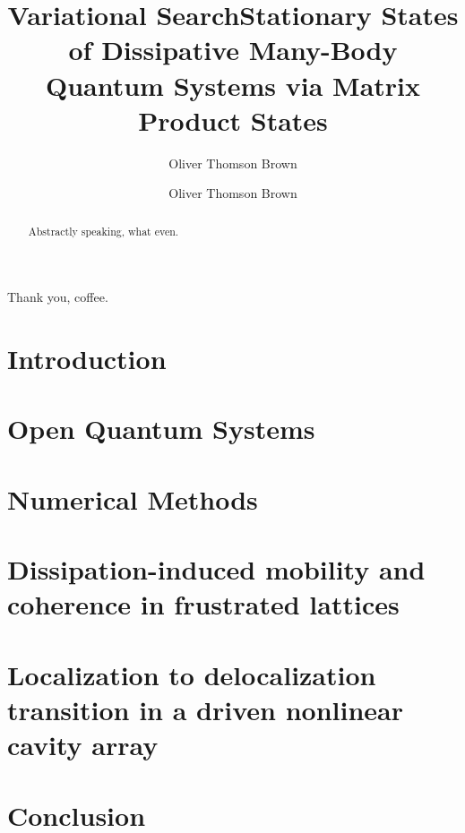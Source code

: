 \documentclass[a4paper,twoside,12pt]{hwthesis}
\author{Oliver Thomson Brown}
\title{Variational Search}
\author{Oliver Thomson Brown}
\title{Stationary States of Dissipative Many-Body Quantum Systems via Matrix Product States}
\newcommand*{\chappath}{../../include/chapters}
\newcommand*{\refpath}{../../include/refs}
\begin{document}
\maketitle


\begin{acknowledgements}
Thank you, coffee.
\end{acknowledgements}

\begin{abstract}
Abstractly speaking, what even.
\end{abstract}

\tableofcontents

\chapter{Introduction}
\setcounter{page}{1}

\chapter{Open Quantum Systems}

\chapter{Numerical Methods}



\chapter{Dissipation-induced mobility and coherence in frustrated lattices}

\chapter{Localization to delocalization transition in a driven nonlinear cavity array}

\chapter{Conclusion}



\end{document}
